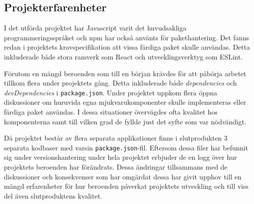 \subsection{Projekterfarenheter}
I det utförda projektet har Javascript varit det huvudsakliga programmeringsspråket och npm har också använts för pakethantering. Det fanns redan i projektets kravspecifikation att vissa färdiga paket skulle användas. Detta inkluderade både stora ramverk som React och utvecklingsverktyg som ESLint.

Förutom en mängd beroenden som till en början krävdes för att påbörja arbetet tillkom flera under projektets gång. Detta inkluderade både \textit{dependencies} och \textit{devDependencies} i \texttt{package.json}. Under projektet uppkom flera öppna diskussioner om huruvida egna mjukvarukomponenter skulle implementeras eller färdiga paket användas. I dessa situationer övervägdes ofta kvalitet hos komponenterna samt till vilken grad de fyllde just det syfte som var nödvändigt.

Då projektet består av flera separata applikationer finns i slutprodukten 3 separata kodbaser med varsin \texttt{package.json}-fil. Eftersom dessa filer har befunnit sig under versionshantering under hela projektet erbjuder de en logg över hur projektets beroenden har förändrats. Dessa ändringar tillsammans med de diskussioner och konsekvenser som har omgärdat dessa har givit upphov till en mängd erfarenheter för hur beroenden påverkat projektets utveckling och till viss del även slutproduktens kvalitet.
